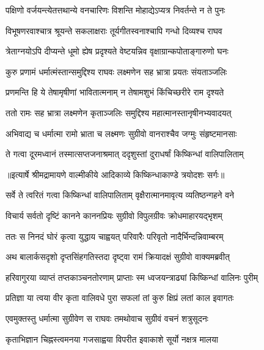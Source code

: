 \twolineshloka
{पक्षिणो वर्जयन्त्येतत्तथान्ये वनचारिणः}
{विशन्ति मोहाद्येऽप्यत्र निवर्तन्ते न ते पुनः} %

\twolineshloka
{विभूषणरवाश्चात्र श्रूयन्ते सकलाक्षराः}
{तूर्यगीतस्वनाश्चापि गन्धो दिव्यश्च राघव} %

\twolineshloka
{त्रेताग्नयोऽपि दीप्यन्ते धूमो ह्येष प्रदृश्यते}
{वेष्टयन्निव वृक्षाग्रान्कपोताङ्गारुणो घनः} %

\twolineshloka
{कुरु प्रणामं धर्मात्मंस्तान्समुद्दिश्य राघवः}
{लक्ष्मणेन सह भ्रात्रा प्रयतः संयताञ्जलिः} %

\twolineshloka
{प्रणमन्ति हि ये तेषामृषीणां भावितात्मनाम्}
{न तेषामशुभं किंचिच्छरीरे राम दृश्यते} %

\twolineshloka
{ततो रामः सह भ्रात्रा लक्ष्मणेन कृताञ्जलिः}
{समुद्दिश्य महात्मानस्तानृषीनभ्यवादयत्} %

\twolineshloka
{अभिवाद्य च धर्मात्मा रामो भ्राता च लक्ष्मणः}
{सुग्रीवो वानराश्चैव जग्मुः संहृष्टमानसाः} %

\twolineshloka
{ते गत्वा दूरमध्वानं तस्मात्सप्तजनाश्रमात्}
{ददृशुस्तां दुराधर्षां किष्किन्धां वालिपालिताम्} %


{॥इत्यार्षे श्रीमद्रामायणे वाल्मीकीये आदिकाव्ये किष्किन्धाकाण्डे त्रयोदशः सर्गः॥}


\twolineshloka
{सर्वे ते त्वरितं गत्वा किष्किन्धां वालिपालिताम्}
{वृक्षैरात्मानमावृत्य व्यतिष्ठन्गहने वने} %

\twolineshloka
{विचार्य सर्वतो दृष्टिं कानने काननप्रियः}
{सुग्रीवो विपुलग्रीवः क्रोधमाहारयद्भृशम्} %

\twolineshloka
{ततः स निनदं घोरं कृत्वा युद्धाय चाह्वयत्}
{परिवारैः परिवृतो नादैर्भिन्दन्निवाम्बरम्} %

\twolineshloka
{अथ बालार्कसदृशो दृप्तसिंहगतिस्तदा}
{दृष्ट्वा रामं क्रियादक्षं सुग्रीवो वाक्यमब्रवीत्} %

\twolineshloka
{हरिवागुरया व्याप्तं तप्तकाञ्चनतोरणाम्}
{प्राप्ताः स्म ध्वजयन्त्राढ्यां किष्किन्धां वालिनः पुरीम्} %

\twolineshloka
{प्रतिज्ञा या त्वया वीर कृता वालिवधे पुरा}
{सफलां तां कुरु क्षिप्रं लतां काल इवागतः} %

\twolineshloka
{एवमुक्तस्तु धर्मात्मा सुग्रीवेण स राघवः}
{तमथोवाच सुग्रीवं वचनं शत्रुसूदनः} %

\twolineshloka
{कृताभिज्ञान चिह्नस्त्वमनया गजसाह्वया}
{विपरीत इवाकाशे सूर्यो नक्षत्र मालया} %


